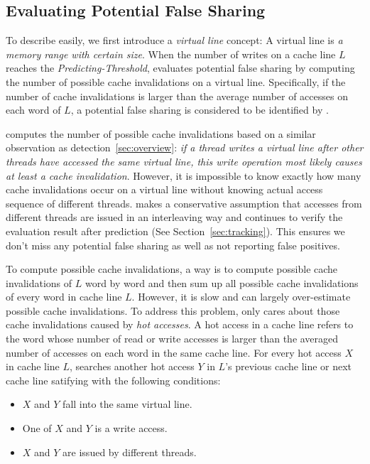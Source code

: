 \subsection{Evaluating Potential False Sharing}
\label{sec:evaluatingfs}
To describe easily, we first introduce a {\it virtual line} concept:
A virtual line is {\it a memory range with certain size}.
When the number of writes on a cache line $L$ reaches the {\it Predicting-Threshold},
 evaluates potential false sharing by computing the number of possible cache 
invalidations on a virtual line. Specifically, if the number of cache
invalidations is larger than the average number of accesses
on each word of $L$, a potential false sharing is considered to
be identified by .

 computes the number of possible cache invalidations based on a 
similar observation as detection~\ref{sec:overview}: 
{\it if a thread writes a virtual line after other threads 
have accessed the same virtual line, this write operation most likely causes at least a cache 
invalidation}. 
However, it is impossible to know exactly how many cache invalidations occur on a virtual
line without knowing actual access sequence of different threads.  
 makes a conservative assumption that 
accesses from different threads are issued in an interleaving way and
continues to verify the evaluation result after prediction (See Section~\ref{sec:tracking}).
This ensures we don't miss any potential false sharing as well as 
not reporting false positives.

To compute possible cache invalidations, a way is to compute possible 
cache invalidations of $L$ word by word and then sum up all possible cache invalidations 
of every word in cache line $L$. 
However, it is slow and can largely over-estimate possible cache invalidations.
To address this problem,  only cares about those cache invalidations caused by
{\it hot accesses}. A hot access in a cache line refers to the word whose number of read or write accesses 
is larger than the averaged number of accesses on each word in the same cache line.
For every hot access $X$ in cache line $L$,  searches another
hot access $Y$ in $L$'s previous cache line or next cache line satifying with
the following conditions: 

\begin{itemize}
\item
$X$ and $Y$ fall into the same virtual line. 

\item
One of $X$ and $Y$ is a write access.

\item 
$X$ and $Y$ are issued by different threads.

\end{itemize}

